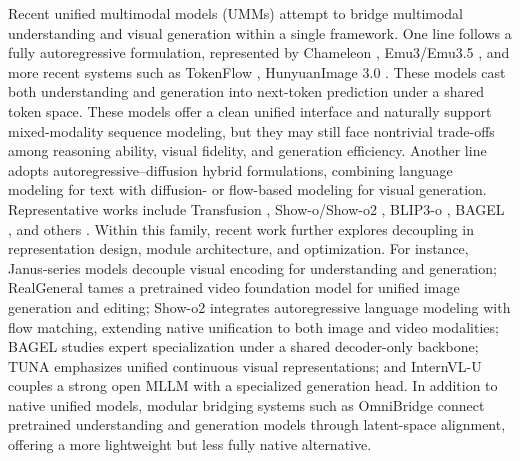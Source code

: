 \documentclass{llmxive}
\begin{document}
Recent unified multimodal models (UMMs) attempt to bridge multimodal understanding and visual generation within a single framework. One line follows a fully {autoregressive formulation}, represented by Chameleon \cite{team2024chameleon}, Emu3/Emu3.5 \cite{wang2024emu3,cui2025emu3}, and more recent systems such as TokenFlow \cite{qu2025tokenflow}, HunyuanImage 3.0 \cite{cao2025hunyuanimage}. These models cast both understanding and generation into next-token prediction under a shared token space. These models offer a clean unified interface and naturally support mixed-modality sequence modeling, but they may still face nontrivial trade-offs among reasoning ability, visual fidelity, and generation efficiency.
Another line adopts {autoregressive–diffusion hybrid formulations}, combining language modeling for text with diffusion- or flow-based modeling for visual generation.
Representative works include Transfusion \cite{zhou2024transfusion}, Show-o/Show-o2 \cite{xie2024show,xie2025show}, BLIP3-o \cite{chen2025blip3}, BAGEL \cite{deng2025emerging}, and others \cite{zhao2025unified,liu2025tuna,wang2025ovis,he2025emma,li2025onecat,tian2025unigen,ma2025janusflow,dai2026chatumm,feng2026dreamlite}.
Within this family, recent work further explores decoupling in representation design, module architecture, and optimization. For instance, Janus-series models \cite{zhao2025unified,ma2025janusflow} decouple visual encoding for understanding and generation; RealGeneral \cite{lin2025realgeneral} tames a pretrained video foundation model for unified image generation and editing; Show-o2 \cite{xie2025show} integrates autoregressive language modeling with flow matching, extending native unification to both image and video modalities; BAGEL \cite{deng2025emerging} studies expert specialization under a shared decoder-only backbone; TUNA \cite{liu2025tuna} emphasizes unified continuous visual representations; and InternVL-U \cite{tian2026internvlu} couples a strong open MLLM with a specialized generation head. 
In addition to native unified models, modular bridging systems such as OmniBridge \cite{xiao2025omnibridge} connect pretrained understanding and generation models through latent-space alignment, offering a more lightweight but less fully native alternative.
\end{document}

